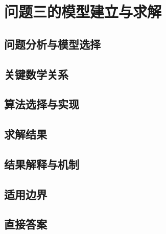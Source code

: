 \section{问题三的模型建立与求解}


\subsection{问题分析与模型选择}


\subsection{关键数学关系}


\subsection{算法选择与实现}


\subsection{求解结果}


\subsection{结果解释与机制}


\subsection{适用边界}


\subsection{直接答案}
